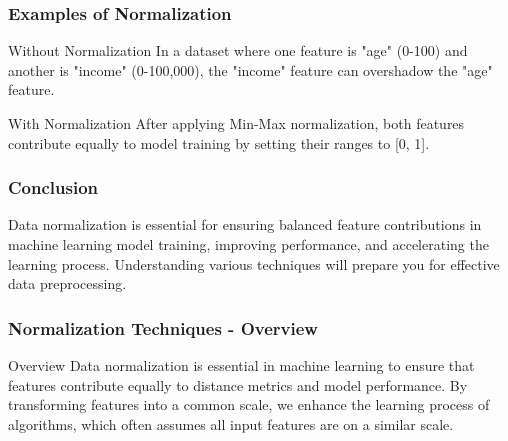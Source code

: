 \documentclass[aspectratio=169]{beamer}
\begin{document}
\begin{frame}[fragile]
    \frametitle{Examples of Normalization}
    \begin{block}{Without Normalization}
        In a dataset where one feature is "age" (0-100) and another is "income" (0-100,000), the "income" feature can overshadow the "age" feature.
    \end{block}

    \begin{block}{With Normalization}
        After applying Min-Max normalization, both features contribute equally to model training by setting their ranges to [0, 1].
    \end{block}
\end{frame}

\begin{frame}[fragile]
    \frametitle{Conclusion}
    Data normalization is essential for ensuring balanced feature contributions in machine learning model training, improving performance, and accelerating the learning process. Understanding various techniques will prepare you for effective data preprocessing.
\end{frame}

\begin{frame}[fragile]
    \frametitle{Normalization Techniques - Overview}
    \begin{block}{Overview}
        Data normalization is essential in machine learning to ensure that features contribute equally to distance metrics and model performance. 
        By transforming features into a common scale, we enhance the learning process of algorithms, which often assumes all input features are on a similar scale.
    \end{block}
\end{frame}
\end{document}
